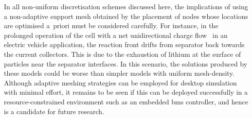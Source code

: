 


In all  non-uniform discretisation schemes  discussed here, the  implications of
using  a non-adaptive  support mesh  obtained by  the placement  of nodes  whose
locations are optimised a~priori must  be considered carefully. For instance, in
the prolonged operation of the cell with a net unidirectional charge flow \eg~in
an electric vehicle  application, the reaction front drifts  from separator back
towards the current collectors. This is due  to the exhaustion of lithium at the
surface  of particles  near  the  separator interfaces.  In  this scenario,  the
solutions  produced by  these models  could be  worse than  simpler models  with
uniform mesh-density. Although  adaptive meshing strategies can  be employed for
desktop simulation  with minimal effort,  it remains to be  seen if this  can be
deployed successfully in a resource-constrained  environment such as an embedded
\gls{bms} controller, and hence is a candidate for future research.


